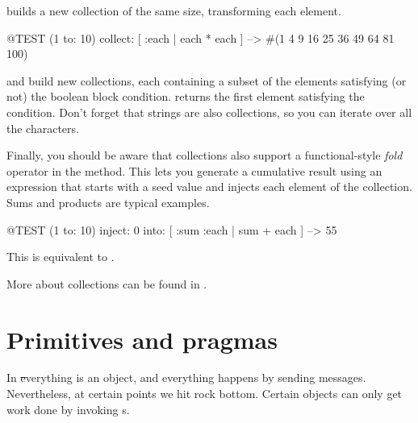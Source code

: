 \documentclass[a4paper,10pt,twoside]{book}
\begin{document}

 builds a new collection of the same size, transforming each element.
\begin{code}{@TEST}
(1 to: 10) collect: [ :each | each * each ] --> #(1 4 9 16 25 36 49 64 81 100)
\end{code}

 and  build new collections, each containing a subset of the elements satisfying (or not) the boolean block condition.
 returns the first element satisfying the condition.
Don't forget that strings are also collections, so you can iterate over all the characters.


Finally, you should be aware that collections also support a functional-style \emph{fold} operator in the  method.
This lets you generate a cumulative result using an expression that starts with a seed value and injects each element of the collection.
Sums and products are typical examples.

\begin{code}{@TEST}
(1 to: 10) inject: 0 into: [ :sum :each | sum + each ] --> 55
\end{code}

\noindent
This is equivalent to .

More about collections can be found in  .

\section{Primitives and pragmas}

In \st everything is an object, and everything happens by sending messages.
Nevertheless, at certain points we hit rock bottom.
Certain objects can only get work done by invoking  s.
\end{document}
